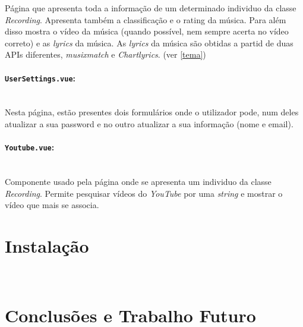 \documentclass{article}
\begin{document}
Página que apresenta toda a informação de um determinado individuo da classe \textit{Recording}. Apresenta também a classificação e o rating da música. Para além disso mostra o vídeo da música (quando possível, nem sempre acerta no vídeo correto) e as \textit{lyrics} da música. As \textit{lyrics} da música são obtidas a partid de duas APIs diferentes, \textit{musixmatch} e \textit{Chartlyrics}. (ver \ref{tema})

\paragraph{\texttt{UserSettings.vue}:}\mbox{}\\

Nesta página, estão presentes dois formulários onde o utilizador pode, num deles atualizar a sua password e no outro atualizar a sua informação (nome e email).

\paragraph{\texttt{Youtube.vue}:}\mbox{}\\

Componente usado pela página onde se apresenta um individuo da classe \textit{Recording}. Permite pesquisar vídeos do \textit{YouTube} por uma \textit{string} e mostrar o vídeo que mais se associa.

\section{Instalação}

~\cite{mbAnnotation}

\section{Conclusões e Trabalho Futuro}


\newpage 
\printbibliography

\begin{appendices}

\end{appendices}
\end{document}
